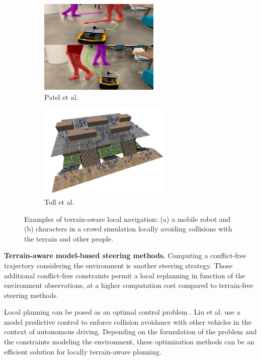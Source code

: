 \begin{figure}[h]
    \centering
    \captionsetup[subfigure]{justification=centering}
    \begin{subfigure}[t]{0.4\linewidth}
    \includegraphics[width=\textwidth,height=4.5cm]{Figures/Chapter_SOTA//dwa_rl.png}
    \caption{Patel et al. \cite{patel_dwa_rl_2021}}
    \label{fig:local_nav_0}
    \end{subfigure}
    \begin{subfigure}[t]{0.5\linewidth}
    \includegraphics[width=\textwidth,height=4.5cm]{Figures/Chapter_SOTA//real_time_density_geraerts.png}
    \caption{Toll et al. \cite{van_toll_crowd_sim_2012}}
    \label{fig:local_nav_1}
    \end{subfigure}
    \caption{Examples of terrain-aware local navigation: (a) a mobile robot and (b) characters in a crowd simulation locally avoiding collisions with the terrain and other people.}
    \label{fig:local_nav}
\end{figure}

\noindent\textbf{Terrain-aware model-based steering methods.}
Computing a conflict-free trajectory considering the environment is another steering strategy. 
Those additional conflict-free constraints permit a local replanning in function of the environment observations, at a higher computation cost compared to terrain-free steering methods.

Local planning can be posed as an optimal control problem \cite{optimal_control_path_planning}. 
Liu et al. \cite{liu_mpc_path_planning_2017} use a model predictive control to enforce collision avoidance with other vehicles in the context of autonomous driving.
Depending on the formulation of the problem and the constraints modeling the environment, these optimization methods can be an efficient solution for locally terrain-aware planning.

